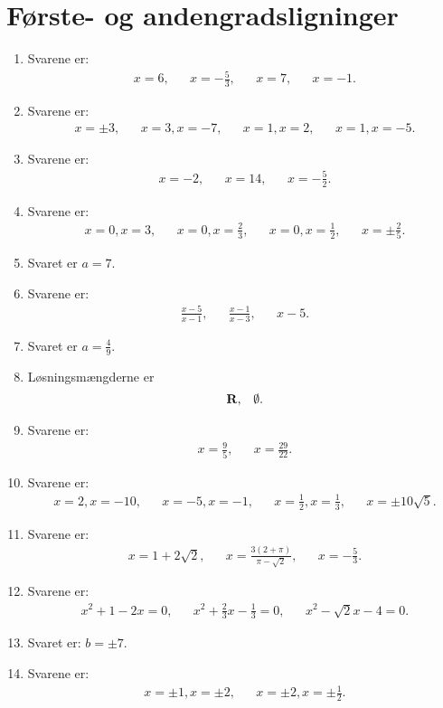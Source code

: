 \section{Første- og andengradsligninger}
\begin{enumerate}
\item Svarene er:
\begin{align*}
x=6,&& x=-\frac{5}{3},&&x=7,&& x=-1.
\end{align*}

\item Svarene er:
\begin{align*}
x=\pm 3,&&x=3,x=-7,&& x=1,x=2,&& x=1,x=-5.
\end{align*}

\item Svarene er:
\begin{align*}
x=-2,&& x=14,&& x=-\frac{5}{2}.
\end{align*}

\item Svarene er:
\begin{align*}
x=0,x=3,&& x=0,x=\frac{2}{3},&& x=0,x=\frac{1}{2},&& x=\pm \frac{2}{5}.
\end{align*}

\item Svaret er $a=7$.

\item Svarene er:
\begin{align*}
\frac{x-5}{x-1},&&\frac{x-1}{x-3},&& x-5.
\end{align*}

\item Svaret er $a=\frac{4}{9}$.

\item Løsningsmængderne er
\begin{align*}
\mathbf{R},&& \emptyset.
\end{align*}


\item Svarene er:
\begin{align*}
x=\frac{9}{5},&& x=\frac{29}{22}.
\end{align*}

\item Svarene er:
\begin{align*}
x=2,x=-10,&& x=-5,x=-1,&&x=\frac{1}{2},x=\frac{1}{3},&& x=\pm 10\sqrt{5}.
\end{align*}



\item Svarene er:
\begin{align*}
x=1+2\sqrt{2},&& x=\frac{3(2+\pi)}{\pi-\sqrt{2}},&& x=-\frac{5}{3}.
\end{align*}

	\item Svarene er:
	\begin{align*}
	x^2+1-2x=0,&& x^2+\frac{2}{3}x-\frac{1}{3}=0,&&  x^2-\sqrt{2}x-4=0.
	\end{align*}
	
	
	\item Svaret er: $b=\pm 7$. 
	
	\item Svarene er:
	\begin{align*}
	x=\pm1,x=\pm 2,&& x=\pm 2,x=\pm \frac{1}{2}.
	\end{align*}

	

	
\end{enumerate}